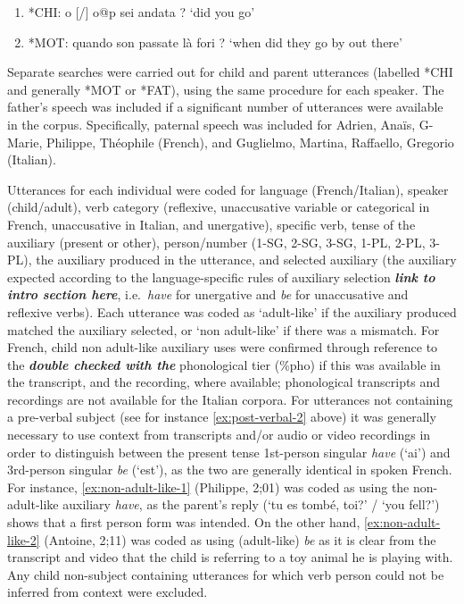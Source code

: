 \documentclass[
  12pt,
]{article}
\begin{document}
\begin{enumerate}[resume*]
  \item{*CHI:   o [/] o@p sei andata ?\label{ex:sei-ppart}} \newline
              `did you go'
  \item{*MOT:   quando son passate là fori ?\label{ex:son-ppart}} \newline
              `when did they go by out there'
  \end{enumerate}

Separate searches were carried out for child and parent utterances (labelled *CHI and generally *MOT or *FAT), using the same procedure for each speaker. The father's speech was included if a significant number of utterances were available in the corpus. Specifically, paternal speech was included for Adrien, Anaïs, G-Marie, Philippe, Théophile (French), and Guglielmo, Martina, Raffaello, Gregorio (Italian).

Utterances for each individual were coded for language (French/Italian), speaker (child/adult), verb category (reflexive, unaccusative variable or categorical in French, unaccusative in Italian, and unergative), specific verb, tense of the auxiliary (present or other), person/number (1-SG, 2-SG, 3-SG, 1-PL, 2-PL, 3-PL), the auxiliary produced in the utterance, and selected auxiliary (the auxiliary expected according to the language-specific rules of auxiliary selection \textbf{\emph{link to intro section here}}, i.e.~\emph{have} for unergative and \emph{be} for unaccusative and reflexive verbs). Each utterance was coded as `adult-like' if the auxiliary produced matched the auxiliary selected, or `non adult-like' if there was a mismatch. For French, child non adult-like auxiliary uses were confirmed through reference to the \textbf{\emph{double checked with the}} phonological tier (\%pho) if this was available in the transcript, and the recording, where available; phonological transcripts and recordings are not available for the Italian corpora. For utterances not containing a pre-verbal subject (see for instance \ref{ex:post-verbal-2} above) it was generally necessary to use context from transcripts and/or audio or video recordings in order to distinguish between the present tense 1st-person singular \emph{have} (`ai') and 3rd-person singular \emph{be} (`est'), as the two are generally identical in spoken French. For instance, \ref{ex:non-adult-like-1} (Philippe, 2;01) was coded as using the non-adult-like auxiliary \emph{have}, as the parent's reply (`tu es tombé, toi?' / `you fell?') shows that a first person form was intended. On the other hand, \ref{ex:non-adult-like-2} (Antoine, 2;11) was coded as using (adult-like) \emph{be} as it is clear from the transcript and video that the child is referring to a toy animal he is playing with. Any child non-subject containing utterances for which verb person could not be inferred from context were excluded.
\end{document}
